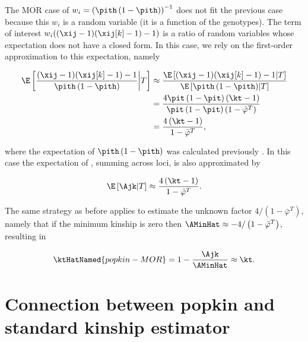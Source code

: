 \documentclass[11pt]{article}
\begin{document}
\begin{linenumbers}
\begin{appendices}
  The MOR case of $w_i = \left( \pith \left( 1 - \pith \right) \right)^{-1}$ does not fit the previous case because this $w_i$ is a random variable (it is a function of the genotypes).
  The term of interest $w_i ( (\xij-1)(\xij[k]-1) - 1 )$ is a ratio of random variables whose expectation does not have a closed form.
  In this case, we rely on the first-order approximation to this expectation, namely
  \begin{linenomath*}
  \begin{align*}
    \E \left[ \frac{ (\xij-1)(\xij[k]-1) - 1 }{ \pith \left( 1 - \pith \right) } \middle| T \right]
    &\approx
      \frac{ \E \left[ (\xij-1)(\xij[k]-1) - 1 \middle| T \right] }{ \E \left[ \pith \left( 1 - \pith \right) \middle| T \right] }
    \\
    &=
      \frac{ 4 \pit \left( 1 - \pit \right) \left( \kt - 1 \right) }{ \pit \left( 1 - \pit \right) \left( 1 - \bar{\varphi}^T \right) }
    \\
    &=
      \frac{ 4 \left( \kt - 1 \right) }{ 1 - \bar{\varphi}^T }
  ,
  \end{align*}
  \end{linenomath*}
  where the expectation of $\pith \left( 1 - \pith \right)$ was calculated previously \citep{ochoa_estimating_2021}.
  In this case the expectation of \Ajk, summing across loci, is also approximated by
  \begin{linenomath*}
  $$
  \E \left[ \Ajk \middle| T \right]
  \approx
  \frac{ 4 \left( \kt - 1 \right) }{ 1 - \bar{\varphi}^T }
  .
  $$
  \end{linenomath*}
  The same strategy as before applies to estimate the unknown factor $4 / \left( 1- \bar{\varphi}^T \right)$, namely that if the minimum kinship is zero then $\AMinHat \approx - 4 / \left( 1- \bar{\varphi}^T \right)$, resulting in
  \begin{linenomath*}
  $$
  \ktHatNamed{popkin-MOR}
  =
  1 - \frac{\Ajk}{\AMinHat}
  \approx
  \kt
  .
  $$
  \end{linenomath*}

  \section{Connection between popkin and standard kinship estimator}

  \label{sec:conn_popkin_std}  


\end{appendices}
\end{linenumbers}
\end{document}
